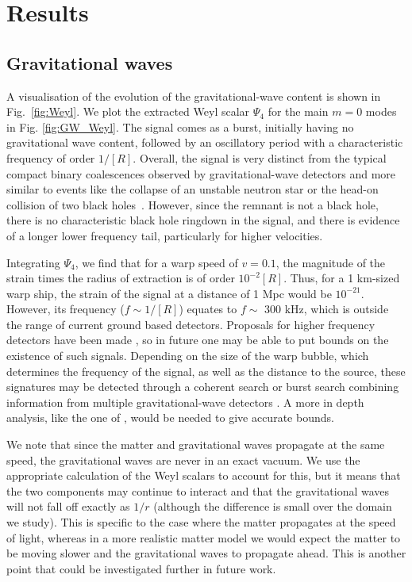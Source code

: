 \documentclass[twocolumn, numberedappendix, twocolappendix,apj, iop, a4paper]{openjournal}
\begin{document}
\section{Results}
\label{sec-results}

\subsection{Gravitational waves}

A visualisation of the evolution of the gravitational-wave content is shown in Fig.~\ref{fig:Weyl}. We plot the extracted Weyl scalar $\Psi_4$ for the main $m=0$ modes in Fig. \ref{fig:GW_Weyl}. The signal comes as a burst, initially having no gravitational wave content, followed by an oscillatory period with a characteristic frequency of order $1/[R]$. Overall, the signal is very distinct from the typical compact binary coalescences observed by gravitational-wave detectors and more similar to events like the collapse of an unstable neutron star or the head-on collision of two black holes~\citep{Giacomazzo:2011cv,Sperhake:2005uf}. However, since the remnant is not a black hole, there is no characteristic black hole ringdown in the signal, and there is evidence of a longer lower frequency tail, particularly for higher velocities.

Integrating $\Psi_4$, we find that for a warp speed of $v=0.1$, the magnitude of the strain times the radius of extraction is of order $10^{-2} [R]$. Thus, for a 1 km-sized warp ship, the strain of the signal at a distance of 1 Mpc would be $10^{-21}$. However, its frequency ($f\sim 1/[R]$) equates to $f\sim$ 300 kHz, which is outside the range of current ground based detectors. Proposals for higher frequency detectors have been made \citep{Aggarwal:2020olq}, so in future one may be able to put bounds on the existence of such signals. Depending on the size of the warp bubble, which determines the frequency of the signal, as well as the distance to the source, these signatures may be detected through a coherent search or burst search combining information from multiple gravitational-wave detectors \citep[e.g.,][]{Sutton:2009gi,Cornish:2014kda,Klimenko:2015ypf}. A more in depth analysis, like the one of \cite{Kuwahara:2023tns}, would be needed to give accurate bounds.

We note that since the matter and gravitational waves propagate at the same speed, the gravitational waves are never in an exact vacuum. We use the appropriate calculation of the Weyl scalars to account for this, but it means that the two components may continue to interact and that the gravitational waves will not fall off exactly as $1/r$ (although the difference is small over the domain we study). This is specific to the case where the matter propagates at the speed of light, whereas in a more realistic matter model we would expect the matter to be moving slower and the gravitational waves to propagate ahead. This is another point that could be investigated further in future work.
\end{document}
